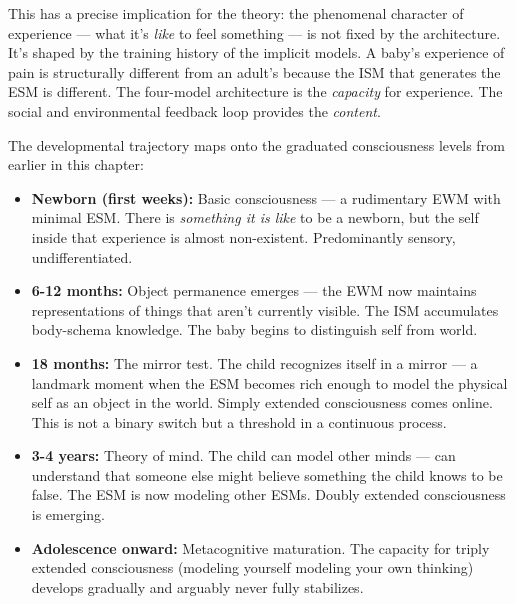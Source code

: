 \documentclass[11pt, twoside, openright]{book}
\begin{document}
This has a precise implication for the theory: the phenomenal character of experience --- what it's \textit{like} to feel something --- is not fixed by the architecture. It's shaped by the training history of the implicit models. A baby's experience of pain is structurally different from an adult's because the ISM that generates the ESM is different. The four-model architecture is the \textit{capacity} for experience. The social and environmental feedback loop provides the \textit{content}.

The developmental trajectory maps onto the graduated consciousness levels from earlier in this chapter:

\begin{itemize}
  \item \textbf{Newborn (first weeks):} Basic consciousness --- a rudimentary EWM with minimal ESM. There is \textit{something it is like} to be a newborn, but the self inside that experience is almost non-existent. Predominantly sensory, undifferentiated.
\end{itemize}

\begin{itemize}
  \item \textbf{6-12 months:} Object permanence emerges --- the EWM now maintains representations of things that aren't currently visible. The ISM accumulates body-schema knowledge. The baby begins to distinguish self from world.
\end{itemize}

\begin{itemize}
  \item \textbf{18 months:} The mirror test. The child recognizes itself in a mirror --- a landmark moment when the ESM becomes rich enough to model the physical self as an object in the world. Simply extended consciousness comes online. This is not a binary switch but a threshold in a continuous process.
\end{itemize}

\begin{itemize}
  \item \textbf{3-4 years:} Theory of mind. The child can model other minds --- can understand that someone else might believe something the child knows to be false. The ESM is now modeling other ESMs. Doubly extended consciousness is emerging.
\end{itemize}

\begin{itemize}
  \item \textbf{Adolescence onward:} Metacognitive maturation. The capacity for triply extended consciousness (modeling yourself modeling your own thinking) develops gradually and arguably never fully stabilizes.
\end{itemize}
\end{document}
